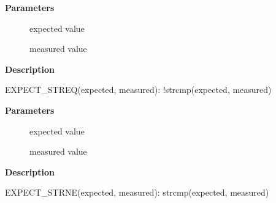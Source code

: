 \documentclass[a4paper,8pt,english]{sphinxmanual}
\begin{document}
\textbf{Parameters}
\begin{description}
\item[{}] \leavevmode
expected value

\item[{}] \leavevmode
measured value

\end{description}

\textbf{Description}

EXPECT\_STREQ(expected, measured): !strcmp(expected, measured)

\begin{fulllineitems}
\label{dev-tools/kselftest:c.EXPECT_STRNE}
\end{fulllineitems}


\textbf{Parameters}
\begin{description}
\item[{}] \leavevmode
expected value

\item[{}] \leavevmode
measured value

\end{description}

\textbf{Description}

EXPECT\_STRNE(expected, measured): strcmp(expected, measured)



\renewcommand{\indexname}{Index}
\printindex
\end{document}
